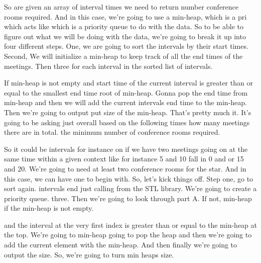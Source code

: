\expandafter\def\csname sourceexcerpt@37\endcsname{%
So are given an array of interval times we need to return number conference rooms
required. And in this case, we're going to use a min-heap, which is a pri which acts
like which is a priority queue to do with the data. So to be able to figure out what we
will be doing with the data, we're going to break it up into four different steps.
One, we are going to sort the intervals by their start times. Second, We will
initialize a min-heap to keep track of all the end times of the meetings. Then three
for each interval in the sorted list of intervals.

If min-heap is not empty and start time of the current interval is greater than or
equal to the smallest end time root of min-heap. Gonna pop the end time from min-heap
and then we will add the current intervals end time to the min-heap. Then we're going
to output put size of the min-heap. That's pretty much it. It's going to be asking
just overall based on the following times how many meetings there are in total. the
minimum number of conference rooms required.

So it could be intervals for instance on if we have two meetings going on at the same
time within a given context like for instance 5 and 10 fall in 0 and or 15 and 20.
We're going to need at least two conference rooms for the star. And in this case, we
can have one to begin with. So, let's kick things off. Step one, go to sort again.
intervals end just calling from the STL library. We're going to create a priority
queue. three. Then we're going to look through part A. If not, min-heap if the
min-heap is not empty.

and the interval at the very first index is greater than or equal to the min-heap at
the top. We're going to min-heap going to pop the heap and then we're going to add the
current element with the min-heap. And then finally we're going to output the size.
So, we're going to turn min heaps size.
}

